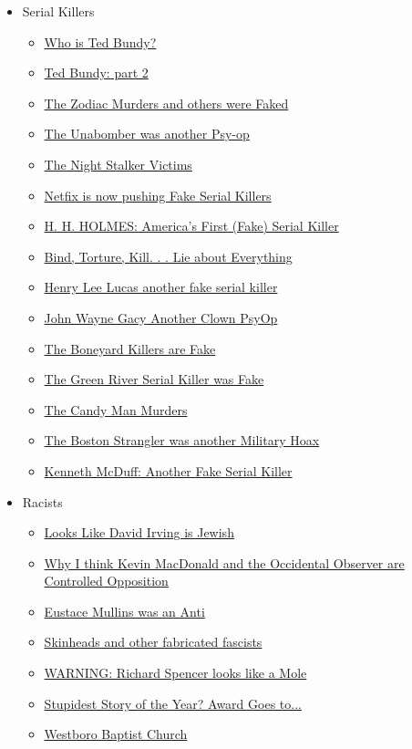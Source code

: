 \documentclass{article}
\newcommand{\insertmydocument}[2]{ %
  \item \href{http://www.mileswmathis.com/#2}{#1}
}
\begin{document}
\begin{itemize}
\begin{itemize}
    \item Serial Killers
    \begin{itemize}

      \insertmydocument{Who is Ted Bundy?}{bundy.pdf}
      \insertmydocument{Ted Bundy: part 2}{bundy2.pdf}
      \insertmydocument{The Zodiac Murders and others were Faked}{zodiac.pdf}
      \insertmydocument{The Unabomber was another Psy-op}{unabomber.pdf}
      \insertmydocument{The Night Stalker Victims}{stalker.pdf}
      \insertmydocument{Netfix is now pushing Fake Serial Killers}{kemper.pdf}
      \insertmydocument{H. H. HOLMES: America’s First (Fake) Serial Killer}{hhholmes.pdf}
      \insertmydocument{Bind, Torture, Kill. . . Lie about Everything}{btk.pdf}
      \insertmydocument{Henry Lee Lucas another fake serial killer}{lucas.pdf}
      \insertmydocument{John Wayne Gacy Another Clown PsyOp}{gacy.pdf}
      \insertmydocument{The Boneyard Killers are Fake}{ng.pdf}
      \insertmydocument{The Green River Serial Killer was Fake}{green.pdf}
      \insertmydocument{The Candy Man Murders}{corll2.pdf}
      \insertmydocument{The Boston Strangler was another Military Hoax}{bostrang.pdf}
      \insertmydocument{Kenneth McDuff: Another Fake Serial Killer}{mcduff.pdf}
    \end{itemize}

    \item Racists
    \begin{itemize}

      \insertmydocument{Looks Like David Irving is Jewish}{irving.pdf}
      \insertmydocument{Why I think Kevin MacDonald and the Occidental Observer are Controlled Opposition}{kevin.pdf}
      \insertmydocument{Eustace Mullins was an Anti}{eust.pdf}
      \insertmydocument{Skinheads and other fabricated fascists}{skinhead.pdf}
      \insertmydocument{WARNING: Richard Spencer looks like a Mole}{spence.pdf}
      \insertmydocument{Stupidest Story of the Year? Award Goes to...}{stern2.pdf}
      \insertmydocument{Westboro Baptist Church}{westboro.pdf}
    \end{itemize}
  \end{itemize}
\end{itemize}
\end{document}

